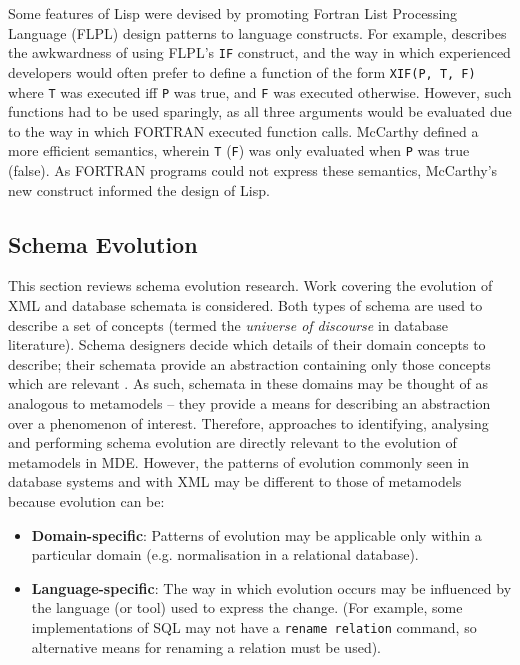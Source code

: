 Some features of Lisp were devised by promoting Fortran List Processing Language (FLPL) design patterns to language constructs. For example, \cite{mcarthy78lisp} describes the awkwardness of using FLPL's \verb|IF| construct, and the way in which experienced developers would often prefer to define a function of the form \verb|XIF(P, T, F)| where \verb|T| was executed iff \verb|P| was true, and \verb|F| was executed otherwise. However, such functions had to be used sparingly, as all three arguments would be evaluated due to the way in which FORTRAN executed function calls. McCarthy \cite{mcarthy78lisp} defined a more efficient semantics, wherein \verb|T| (\verb|F|) was only evaluated when  \verb|P| was true (false). As FORTRAN programs could not express these semantics, McCarthy's new construct informed the design of Lisp.


\subsection{Schema Evolution}
\label{LitReview:Schemas}
This section reviews schema evolution research. Work covering the evolution of XML and database schemata is considered. Both types of schema are used to describe a set of concepts (termed the \textit{universe of discourse} in database literature). Schema designers decide which details of their domain concepts to describe; their schemata provide an abstraction containing only those concepts which are relevant \cite[pg30]{elmasri06database}. As such, schemata in these domains may be thought of as analogous to metamodels -- they provide a means for describing an abstraction over a phenomenon of interest. Therefore, approaches to identifying, analysing and performing schema evolution are directly relevant to the evolution of metamodels in MDE. However, the patterns of evolution commonly seen in database systems and with XML may be different to those of metamodels because evolution can be:

\begin{itemize}
 \item \textbf{Domain-specific}: Patterns of evolution may be applicable only within a particular domain (e.g. normalisation in a relational database).
 \item \textbf{Language-specific}: The way in which evolution occurs may be influenced by the language (or tool) used to express the change. (For example, some implementations of SQL may not have a \texttt{rename relation} command, so alternative means for renaming a relation must be used).
\end{itemize}

